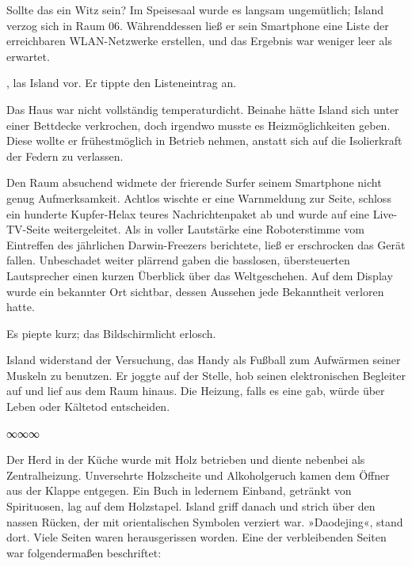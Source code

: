 Sollte das ein Witz sein? Im Speisesaal wurde es langsam ungemütlich; Island verzog sich in Raum 06. Währenddessen ließ er sein Smartphone eine Liste der erreichbaren WLAN-Netzwerke erstellen, und das Ergebnis war weniger leer als erwartet.

, las Island vor. Er tippte den Listeneintrag an.

Das Haus war nicht vollständig temperaturdicht. Beinahe hätte Island sich unter einer Bettdecke verkrochen, doch irgendwo musste es Heizmöglichkeiten geben. Diese wollte er frühestmöglich in Betrieb nehmen, anstatt sich auf die Isolierkraft der Federn zu verlassen.

Den Raum absuchend widmete der frierende Surfer seinem Smartphone nicht genug Aufmerksamkeit. Achtlos wischte er eine Warnmeldung zur Seite, schloss ein hunderte Kupfer-Helax teures Nachrichtenpaket ab und wurde auf eine Live-TV-Seite weitergeleitet. Als in voller Lautstärke eine Roboterstimme vom Eintreffen des jährlichen Darwin-Freezers berichtete, ließ er erschrocken das Gerät fallen. Unbeschadet weiter plärrend gaben die basslosen, übersteuerten Lautsprecher einen kurzen Überblick über das Weltgeschehen. Auf dem Display wurde ein bekannter Ort sichtbar, dessen Aussehen jede Bekanntheit verloren hatte.


Es piepte kurz; das Bildschirmlicht erlosch.


Island widerstand der Versuchung, das Handy als Fußball zum Aufwärmen seiner Muskeln zu benutzen. Er joggte auf der Stelle, hob seinen elektronischen Begleiter auf und lief aus dem Raum hinaus. Die Heizung, falls es eine gab, würde über Leben oder Kältetod entscheiden.

\begin{center}
∞∞∞
\end{center}

Der Herd in der Küche wurde mit Holz betrieben und diente nebenbei als Zentralheizung. Unversehrte Holzscheite und Alkoholgeruch kamen dem Öffner aus der Klappe entgegen. Ein Buch in ledernem Einband, getränkt von Spirituosen, lag auf dem Holzstapel. Island griff danach und strich über den nassen Rücken, der mit orientalischen Symbolen verziert war. »Daodejing«, stand dort. Viele Seiten waren herausgerissen worden. Eine der verbleibenden Seiten war folgendermaßen beschriftet:


